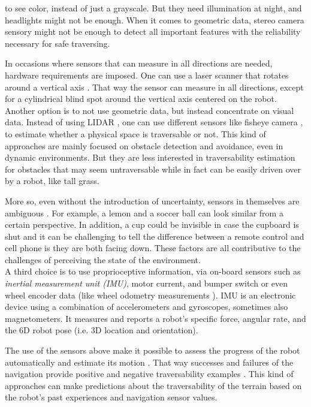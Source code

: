 \documentclass[12pt,a4paper,table,dvipsnames,tikz]{report}
\newcommand{\term}{\textit}
\newcommand{\acronym}{\MakeUppercase}
\begin{document}
	to see color, instead of just a grayscale. But they need illumination at night, 
	and headlights might not be enough. When it comes to geometric data, stereo 
	camera sensory might not be enough to detect all important features with the 
	reliability necessary for safe traversing.
	\par
	In occasions where sensors that can measure in all directions are needed, 
	hardware requirements are imposed. One can use a laser scanner that rotates 
	around a vertical axis \citep{Droeschel}. That way the sensor can measure in 
	all directions, except for a cylindrical blind spot around the vertical axis 
	centered on the robot.
	\\
	
	Another option is to not use geometric data, but instead concentrate on visual 
	data. Instead of using \acronym{lidar} \citep{Suger, Lalonde}, one can use 
	different sensors like fisheye camera \citep{Hirose, HiroseGonet}, 
	to estimate whether a physical space is traversable or not. This kind of 
	approaches are mainly focused on obstacle detection and avoidance, even in 
	dynamic environments. But they are less interested in traversability 
	estimation for obstacles that may seem untraversable while in fact can be 
	easily driven over by a robot, like tall grass.
	\par
	More so, even without the introduction of uncertainty, sensors in themselves are 
	ambiguous \citep{Shabbir}. For example, a lemon and a soccer ball can look 
	similar from a certain perspective. In addition, a cup could be invisible in case 
	the cupboard is shut and it can be challenging to tell the difference between a 
	remote control and cell phone is they are both facing down. These factors are all
	contributive to the challenges of perceiving the state of the environment.
	\\
	
	A third choice is to use proprioceptive information, via on-board sensors such 
	as \term{inertial measurement unit (\acronym{imu})}, motor current, and bumper 
	switch \citep{Kim} or even wheel encoder data \citep{Lee} (like wheel odometry 
	measurements \citep{Droeschel}). \acronym{imu} is an electronic device using 
	a combination of accelerometers and gyroscopes, sometimes also magnetometers. 
	It measures and reports a robot's specific force, angular rate, and the 
	\acronym{6d} robot pose (i.e. \acronym{3d} location and orientation).
	\par
	The use of the sensors above make it possible to assess the progress of the 
	robot automatically and estimate its motion \citep{Droeschel}. That way successes 
	and failures of the navigation provide positive and negative traversability 
	examples \citep{Kim}. This kind of approaches can make predictions about the 
	traversability of the terrain based on the robot's past experiences and 
	navigation sensor values.
	\\
	
\end{document}
